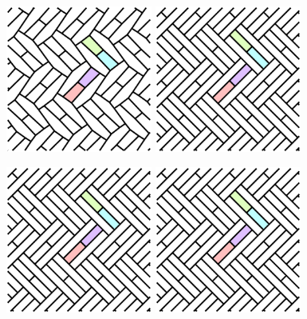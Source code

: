 \documentclass{beamer}
\begin{document}
\begin{frame}
  \begin{center}
    \includegraphics[width=1.9in]{c11}
    \includegraphics[width=1.9in]{c12}
  \end{center}
\end{frame}

\begin{frame}
  \begin{center}
    \includegraphics[width=1.9in]{c12}
    \includegraphics[width=1.9in]{c12}
  \end{center}
\end{frame}
\end{document}
